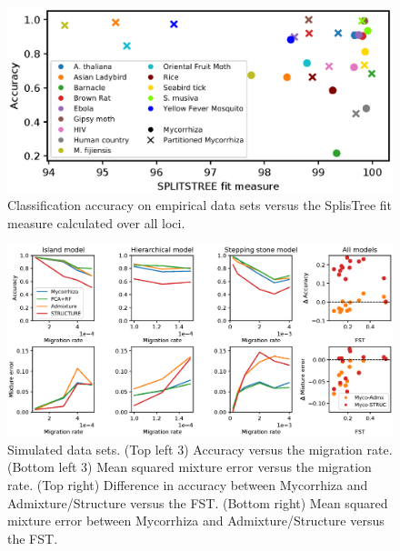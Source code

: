 \documentclass[final]{bioinfo}
\begin{document}
\begin{figure}[!tbp]%
    \includegraphics[width=\linewidth]{figure5.eps}
    \caption{Classification accuracy on empirical data sets versus the SplisTree fit measure calculated over all loci.}\label{fig:05}
\end{figure}
\begin{figure}[!tbp]%
    \includegraphics[width=\linewidth]{figure6.eps}
    \caption{Simulated data sets. (Top left 3) Accuracy versus the migration rate. (Bottom left 3) Mean squared mixture error versus the migration rate. (Top right) Difference in accuracy between Mycorrhiza and Admixture/Structure versus the FST. (Bottom right) Mean squared mixture error between Mycorrhiza and Admixture/Structure versus the FST.}\label{fig:06}
\end{figure}
\end{document}
